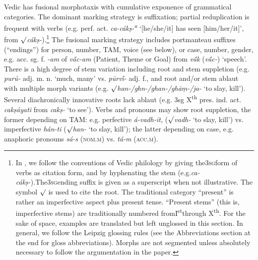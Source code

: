 \documentclass[output=paper]{langscibook}
\begin{document}
Vedic has fusional morphotaxis with cumulative exponence of grammatical categories. The dominant marking strategy is suffixation; partial reduplication is frequent with verbs (e.g. perf. act. {\textit{ca-cákṣ-\textsuperscript{a}} ‘[he/she/it] has seen [him/her/it]’, from ${\surd}$\textit{cákṣ-}).}\footnote{{{In , we follow the conventions of Vedic philology by giving the}{\textsc{3sg}}{form of verbs as citation form, and by hyphenating the stem (e.g.}{\textit{ca-cákṣ-}}).{The}{\textsc{3sg}}{ending suffix is given as a superscript when not illustrative. The symbol ${\surd}$ is used to cite the root. The traditional category “present” is rather an imperfective aspect plus present tense. “Present stems” (this is, imperfective stems) are traditionally numbered from}{I}{\textsuperscript{st}}{through X}{\textsuperscript{th}}{. For the sake of space, examples are translated but left unglossed in this section. In general, we follow the Leipzig glossing rules (see the Abbreviations section at the end for gloss abbreviations). Morphs are not segmented unless absolutely necessary to follow the argumentation in the paper.}}}{ The fusional marking strategy includes portmanteau suffixes (“endings”) for person, number, TAM, voice (see below), or case, number, gender, e.g. acc. sg. f. \textit{{}-am} of \textit{v\'{ā}c-am} (Patient, Theme or Goal) from \textit{v\'{ā}k} (\textit{v\'{ā}c-}) ‘speech’. There is a high degree of stem variation including root and stem suppletion (e.g. \textit{purú-} adj. m. n. ‘much, many’ vs. \textit{pūrv\'{ī}-} adj. f., and root and/or stem ablaut with multiple morph variants (e.g. ${\surd}$\textit{han-/ghn-/ghan-/ghāṃ-/ja-} ‘to slay, kill’). Several diachronically innovative roots lack ablaut (e.g. 3sg X\textsuperscript{th} pres. ind. act. \textit{cakṣáyati} from \textit{cakṣ-} ‘to see’). Verbs and pronouns may show root suppletion, the former depending on TAM: e.g. perfective \textit{á-vadh-īt,} (${\surd}$\textit{vadh-} ‘to slay, kill’) vs. imperfective \textit{hán-ti} (${\surd}$\textit{han-} ‘to slay, kill’); the latter depending on case, e.g. anaphoric pronouns \textit{sá-s} (\textsc{nom.m}) vs. \textit{tá-m} (\textsc{acc.m}).}
\end{document}
